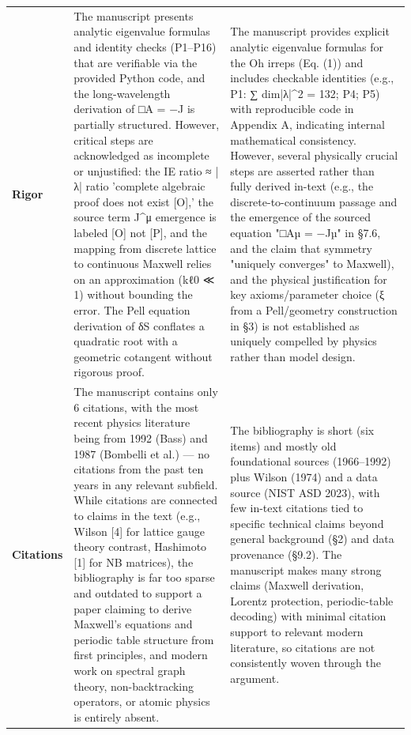 \documentclass[11pt]{article}
\begin{document}
\begin{longtable}{@{} p{2.2cm} p{6.3cm} p{6.3cm} @{}}
\rowcolor{rowgray}
\textbf{Rigor} &
The manuscript presents analytic eigenvalue formulas and identity checks (P1–P16) that are verifiable via the provided Python code, and the long-wavelength derivation of □A = −J is partially structured. However, critical steps are acknowledged as incomplete or unjustified: the IE ratio ≈ |λ| ratio 'complete algebraic proof does not exist [O],' the source term J\textasciicircum{}μ emergence is labeled [O] not [P], and the mapping from discrete lattice to continuous Maxwell relies on an approximation (kℓ0 ≪ 1) without bounding the error. The Pell equation derivation of δS conflates a quadratic root with a geometric cotangent without rigorous proof. &
The manuscript provides explicit analytic eigenvalue formulas for the Oh irreps (Eq. (1)) and includes checkable identities (e.g., P1: ∑ dim|λ|\textasciicircum{}2 = 132; P4; P5) with reproducible code in Appendix A, indicating internal mathematical consistency. However, several physically crucial steps are asserted rather than fully derived in-text (e.g., the discrete-to-continuum passage and the emergence of the sourced equation "□Aµ = −Jµ" in §7.6, and the claim that symmetry "uniquely converges" to Maxwell), and the physical justification for key axioms/parameter choice (ξ from a Pell/geometry construction in §3) is not established as uniquely compelled by physics rather than model design. \\[6pt]

\textbf{Citations} &
The manuscript contains only 6 citations, with the most recent physics literature being from 1992 (Bass) and 1987 (Bombelli et al.) — no citations from the past ten years in any relevant subfield. While citations are connected to claims in the text (e.g., Wilson [4] for lattice gauge theory contrast, Hashimoto [1] for NB matrices), the bibliography is far too sparse and outdated to support a paper claiming to derive Maxwell's equations and periodic table structure from first principles, and modern work on spectral graph theory, non-backtracking operators, or atomic physics is entirely absent. &
The bibliography is short (six items) and mostly old foundational sources (1966–1992) plus Wilson (1974) and a data source (NIST ASD 2023), with few in-text citations tied to specific technical claims beyond general background (§2) and data provenance (§9.2). The manuscript makes many strong claims (Maxwell derivation, Lorentz protection, periodic-table decoding) with minimal citation support to relevant modern literature, so citations are not consistently woven through the argument. \\

\end{longtable}
\end{document}
